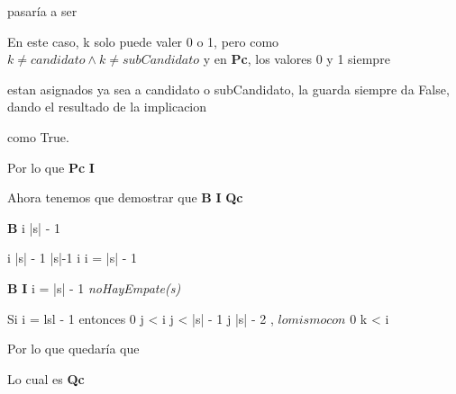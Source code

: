 \documentclass[10pt,a4paper]{article}
\begin{document}
{{pasaría a ser 


En este caso, k solo puede valer 0 o 1, pero como $k \neq candidato \wedge k \neq subCandidato$ y en \textbf{Pc}, los valores 0 y 1 siempre 

estan asignados ya sea a candidato o subCandidato, la guarda siempre da False, dando el resultado de la implicacion 

como True.

\vspace{5mm}

Por lo que \textbf{Pc} \implies \textbf{I}

\vspace{5mm}

Ahora tenemos que demostrar que \neg\textbf{B} \wedge  \textbf{I} \implies \textbf{Qc}

\vspace{5mm}

\neg\textbf{B} \equiv i \geq |s| - 1

i \geq |s| - 1 \wedge |s|-1 \geq i  \equiv i = |s| - 1

\neg\textbf{B} \wedge  \textbf{I} \equiv i = |s| - 1 \wedge  \textit{noHayEmpate(s)} \wedge


 \wedge 


\vspace{5mm}

Si i = lsl - 1 entonces 0 \leq j < i  \leq j < |s| - 1  \leq j \leq |s| - 2 , $ lo mismo con $ 0 \leq k < i

Por lo que quedaría que 


 { \wedge 
 
 {

 Lo cual es \textbf{Qc}

 \vspace{5mm}

}}}}
\end{document}
